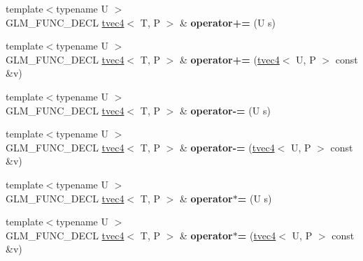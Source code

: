 \begin{DoxyCompactItemize}
\item 
{\footnotesize template$<$typename U $>$ }\\G\+L\+M\+\_\+\+F\+U\+N\+C\+\_\+\+D\+E\+CL \hyperlink{structglm_1_1detail_1_1tvec4}{tvec4}$<$ T, P $>$ \& {\bfseries operator+=} (U s)\hypertarget{structglm_1_1detail_1_1tvec4_a2698ceff8c17d81e180dfd6dd2f7031e}{}\label{structglm_1_1detail_1_1tvec4_a2698ceff8c17d81e180dfd6dd2f7031e}

\item 
{\footnotesize template$<$typename U $>$ }\\G\+L\+M\+\_\+\+F\+U\+N\+C\+\_\+\+D\+E\+CL \hyperlink{structglm_1_1detail_1_1tvec4}{tvec4}$<$ T, P $>$ \& {\bfseries operator+=} (\hyperlink{structglm_1_1detail_1_1tvec4}{tvec4}$<$ U, P $>$ const \&v)\hypertarget{structglm_1_1detail_1_1tvec4_a97b781953b588e8a5063f52ada786bdb}{}\label{structglm_1_1detail_1_1tvec4_a97b781953b588e8a5063f52ada786bdb}

\item 
{\footnotesize template$<$typename U $>$ }\\G\+L\+M\+\_\+\+F\+U\+N\+C\+\_\+\+D\+E\+CL \hyperlink{structglm_1_1detail_1_1tvec4}{tvec4}$<$ T, P $>$ \& {\bfseries operator-\/=} (U s)\hypertarget{structglm_1_1detail_1_1tvec4_abac89afd5c01b6f6b87d826255edf0dd}{}\label{structglm_1_1detail_1_1tvec4_abac89afd5c01b6f6b87d826255edf0dd}

\item 
{\footnotesize template$<$typename U $>$ }\\G\+L\+M\+\_\+\+F\+U\+N\+C\+\_\+\+D\+E\+CL \hyperlink{structglm_1_1detail_1_1tvec4}{tvec4}$<$ T, P $>$ \& {\bfseries operator-\/=} (\hyperlink{structglm_1_1detail_1_1tvec4}{tvec4}$<$ U, P $>$ const \&v)\hypertarget{structglm_1_1detail_1_1tvec4_ad5f9a3e666a750055fa074ba58c67d09}{}\label{structglm_1_1detail_1_1tvec4_ad5f9a3e666a750055fa074ba58c67d09}

\item 
{\footnotesize template$<$typename U $>$ }\\G\+L\+M\+\_\+\+F\+U\+N\+C\+\_\+\+D\+E\+CL \hyperlink{structglm_1_1detail_1_1tvec4}{tvec4}$<$ T, P $>$ \& {\bfseries operator$\ast$=} (U s)\hypertarget{structglm_1_1detail_1_1tvec4_a938a7911eafdf499c4c4461255343d93}{}\label{structglm_1_1detail_1_1tvec4_a938a7911eafdf499c4c4461255343d93}

\item 
{\footnotesize template$<$typename U $>$ }\\G\+L\+M\+\_\+\+F\+U\+N\+C\+\_\+\+D\+E\+CL \hyperlink{structglm_1_1detail_1_1tvec4}{tvec4}$<$ T, P $>$ \& {\bfseries operator$\ast$=} (\hyperlink{structglm_1_1detail_1_1tvec4}{tvec4}$<$ U, P $>$ const \&v)\hypertarget{structglm_1_1detail_1_1tvec4_a37ac1922f8feef122bfa57800b4124f4}{}\label{structglm_1_1detail_1_1tvec4_a37ac1922f8feef122bfa57800b4124f4}


\end{DoxyCompactItemize}
